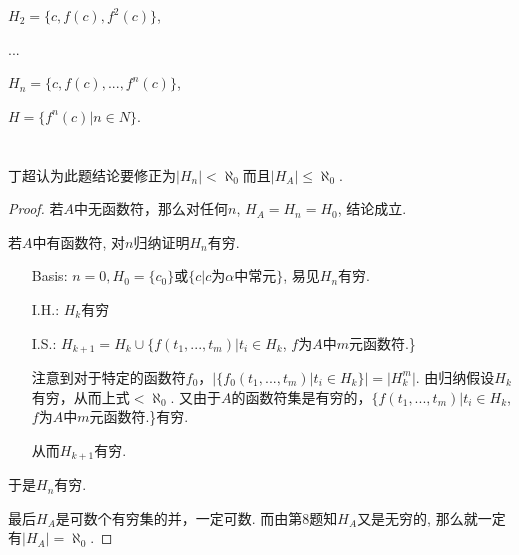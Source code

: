 \documentclass{article}
\begin{document}
$H_2=\{c,f(c),f^2(c)\}$,

...

$H_n=\{c,f(c),...,f^n(c)\}$,

$H=\{f^n(c)|n \in N\}$.


\section{}
丁超认为此题结论要修正为$|H_n| < \aleph_0$而且$|H_A| \le \aleph_0$. 
\begin{proof}
若$A$中无函数符，那么对任何$n$, $H_A = H_n = H_0$, 结论成立. 
	
若$A$中有函数符, 对$n$归纳证明$H_n$有穷. 
\begin{itemize}
\item[Basis:]$n=0, H_0=\{c_0\}$或$\{c|c$为$\alpha$中常元$\}$, 易见$H_n$有穷. 

\item[I.H.:] $H_k$有穷

\item[I.S.:] $H_{k+1} = H_k \cup \{ f(t_1,...,t_m)|t_i \in H_k$, $f$为$A$中$m$元函数符.\}

注意到对于特定的函数符$f_0$，$|\{f_0(t_1,...,t_m)|t_i \in H_k\}| = |H_k^m|$. 
由归纳假设$H_k$有穷，从而上式$< \aleph_0$. 又由于$A$的函数符集是有穷的，$\{ f(t_1,...,t_m)|t_i \in H_k$, $f$为$A$中$m$元函数符.\}有穷. 

从而$H_{k+1}$有穷. 


\end{itemize}
于是$H_n$有穷. 

最后$H_A$是可数个有穷集的并，一定可数. 而由第8题知$H_A$又是无穷的, 那么就一定有$|H_A| = \aleph_0$. 

\end{proof}
\end{document}
